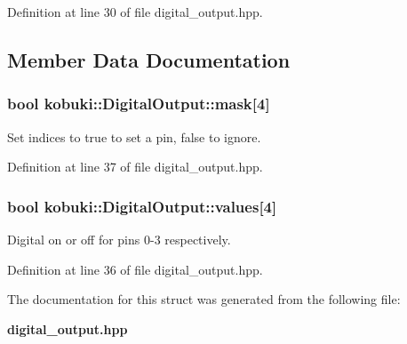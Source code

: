 \-Definition at line 30 of file digital\-\_\-output.\-hpp.



\subsection{\-Member \-Data \-Documentation}
\subsubsection[{mask}]{\setlength{\rightskip}{0pt plus 5cm}bool {\bf kobuki\-::\-Digital\-Output\-::mask}[4]}\label{structkobuki_1_1DigitalOutput_aa271e48616aaacd4c543a724384e18fd}
\-Set indices to true to set a pin, false to ignore. 

\-Definition at line 37 of file digital\-\_\-output.\-hpp.

\subsubsection[{values}]{\setlength{\rightskip}{0pt plus 5cm}bool {\bf kobuki\-::\-Digital\-Output\-::values}[4]}\label{structkobuki_1_1DigitalOutput_a06fc47a52ddab0be6bef25928239e329}
\-Digital on or off for pins 0-\/3 respectively. 

\-Definition at line 36 of file digital\-\_\-output.\-hpp.



\-The documentation for this struct was generated from the following file\-:\begin{DoxyCompactItemize}
\item 
{\bf digital\-\_\-output.\-hpp}\end{DoxyCompactItemize}
